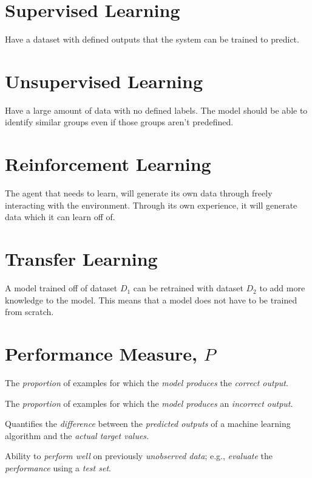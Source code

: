 \documentclass[
	title={ML Fundamentals}
]{cs584notes}
\begin{document}

\tableofcontents

\section{Supervised Learning}\label{sec:supervised-learning}
Have a dataset with defined outputs that the system can be trained to predict.

\section{Unsupervised Learning}\label{sec:unsupervised-learning}
Have a large amount of data with no defined labels.
The model should be able to identify similar groups even if those groups aren't predefined.

\section{Reinforcement Learning}\label{sec:reinforcement-learning}
The agent that needs to learn, will generate its own data through freely interacting with the environment.
Through its own experience, it will generate data which it can learn off of.

\section{Transfer Learning}\label{sec:transfer-learning}
A model trained off of dataset $D_{1}$ can be retrained with dataset $D_{2}$ to add more knowledge to the model.
This means that a model does not have to be trained from scratch.

\section{Performance Measure, $P$}\label{sec:performance-measure-$p$}
\begin{description}[font=\color{emphblue}]
	\item[Accuracy:] The \emph{proportion} of examples for which the \emph{model produces} the \emph{correct output}.
	\item[Error rate:] The \emph{proportion} of examples for which the \emph{model produces} an \emph{incorrect output}.
	\item[Loss function:] Quantifies the \emph{difference} between the \emph{predicted outputs} of a machine learning algorithm and the \emph{actual target values.}
	\item[Generalization] Ability to \emph{perform well} on previously \emph{unobserved data}; e.g., \emph{evaluate} the \emph{performance} using a \emph{test set}.
\end{description}
\end{document}
